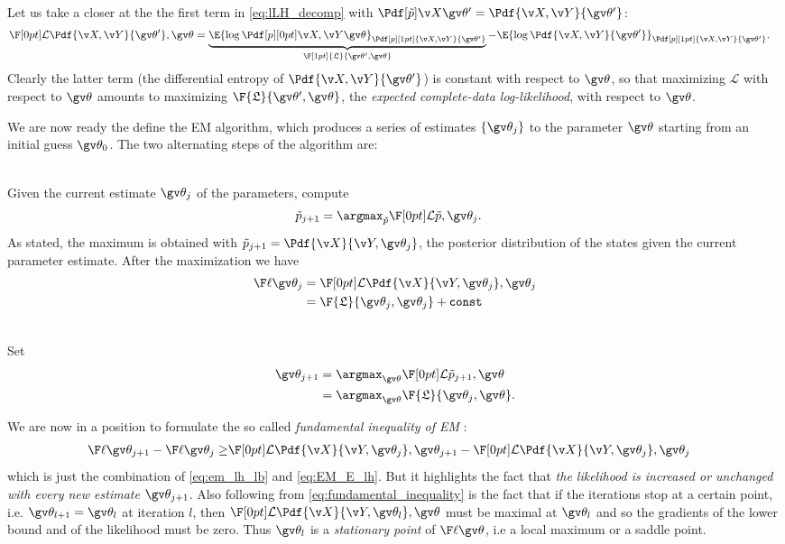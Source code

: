 Let us take a closer at the the first term in \eqref{eq:lLH_decomp} with $\tPX=\Pdf{\X,\Y}{\Th'}$:
\begin{align}
	\LB{\Pdf{\X,\Y}{\Th'},\Th}&=
	\underbrace{\E{\log\cLH}_{\Pdf[p][1pt]{\X,\Y}{\Th'}}}_{\F[1pt]{\Lb}{\Th',\Th}} 
	-\E{\log\Pdf{\X,\Y}{\Th'}}_{\Pdf[p][1pt]{\X,\Y}{\Th'}}.
	\label{eq:completedata_loglikelihood}
\end{align}
Clearly the latter term (the differential entropy of $\Pdf{\X,\Y}{\Th'}$) is constant 
with respect to $\Th$, so that maximizing $\mathcal{L}$ with respect to $\Th$ amounts to
maximizing $\F{\Lb}{\Th',\Th}$, the \emph{expected complete-data log-likelihood},
with respect to $\Th$.


We are now ready the define the EM algorithm, which produces
a series of estimates $\{\Th_j\}$ to the parameter $\Th$
starting from an initial guess $\Th_0$. The two alternating
steps of the algorithm are:

\begin{description}
\addtolength{\leftskip}{1cm}
  \item[E-step]\hfill\\
  Given the current estimate $\Th_j$ of the parameters, compute	
  	\begin{align}
		\tP_{j+1} &= \argmax_{\tP}\LB{\tP,\Th_j}.
		\label{eq:EM_E}
	\end{align}
  As stated, the maximum is obtained with 
  $\tP_{j+1} = \Pdf{\X}{\Y,\Th_j}$, the posterior
  distribution of the states given the current parameter estimate. After the maximization
  we have
  	\begin{align}
  		\lLH[\Th_j]&=\LB{\Pdf{\X}{\Y,\Th_j},\Th_j} \label{eq:EM_E_lh}\\
  		 &= \F{\Lb}{\Th_j,\Th_j}+\mathtt{const}\nonumber 
	\end{align}
  \item[M-step]\hfill\\ 
  Set
    \begin{align}
		\Th_{j+1}&=\argmax_{\Th}\LB{\tP_{j+1},\Th} \label{eq:EM_M}\\
		&=\argmax_{\Th}\F{\Lb}{\Th_j,\Th}\nonumber.
	\end{align}
\end{description}
We are now in a position to formulate the so called \emph{fundamental inequality of EM} \parencite{Cappe2005}:
\begin{align}
	\lLH[\Th_{j+1}] - \lLH[\Th_j]\geq & \LB{\Pdf{\X}{\Y,\Th_j},\Th_{j+1}} - \LB{\Pdf{\X}{\Y,\Th_j},\Th_{j}} 
	\label{eq:fundamental_inequality}
\end{align}
which is just the combination of \eqref{eq:em_lh_lb} and \eqref{eq:EM_E_lh}. But it highlights
the fact that \emph{the likelihood is increased or unchanged with every new estimate} $\Th_{j+1}$.
Also following from \eqref{eq:fundamental_inequality} is the fact that if the iterations
stop at a certain point, i.e. $\Th_{l+1}=\Th_l$ at iteration $l$, then
$\LB{\Pdf{\X}{\Y,\Th_l},\Th}$ must be maximal at $\Th_l$
and so the gradients of the lower bound and of the likelihood must be zero. Thus
$\Th_l$ is a \emph{stationary point} of $\lLH$, i.e a local maximum or a saddle point.


